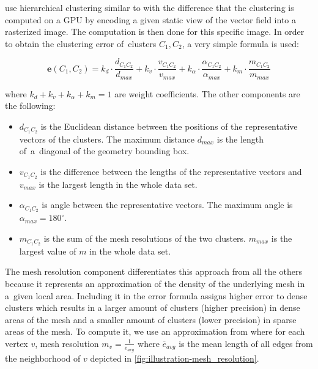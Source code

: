 \citet{Peng12} use hierarchical clustering similar to \citet{Telea99} with the difference that the clustering is computed on a GPU by encoding a given static view of the vector field into a rasterized image. The computation is then done for this specific image. In order to obtain the clustering error of~clusters \(C_1, C_2\), a very simple formula is used:

\begin{equation} \label{eq:clustering_error}
\bm{e}(C_1,C_2) = k_d \cdot \frac{d_{C_1C_2}}{d_{max}} + k_v \cdot \frac{v_{C_1C_2}}{v_{max}} + k_\alpha \cdot \frac{\alpha_{C_1C_2}}{\alpha_{max}} + k_m \cdot \frac{m_{C_1C_2}}{m_{max}}
\end{equation}

where \(k_d + k_v + k_\alpha + k_m = 1\) are weight coefficients. The other components are the following:

\begin{itemize}
\item \(d_{C_1C_2}\) is the Euclidean distance between the positions of the representative vectors of the clusters. The maximum distance \(d_{max}\) is the length of~a~diagonal of the geometry bounding box.
\item \(v_{C_1C_2}\) is the difference between the lengths of the representative vectors and \(v_{max}\) is the largest length in the whole data set.
\item \(\alpha_{C_1C_2}\) is angle between the representative vectors. The maximum angle is \(\alpha_{max} = 180^\circ\).
\item \(m_{C_1C_2}\) is the sum of the mesh resolutions of the two clusters. \(m_{max}\) is the largest value of \(m\) in the whole data set.
\end{itemize}

The mesh resolution component differentiates this approach from all the others because it represents an approximation of the density of the underlying mesh in a~given local area\footnotemark. Including it in the error formula assigns higher error to dense clusters which results in a larger amount of clusters (higher precision) in dense areas of the mesh and a smaller amount of clusters (lower precision) in sparse areas of the mesh. To compute it, we use an approximation from \citet{Peng12} where for each vertex \(v\), mesh resolution \(m_v = \frac{1}{{\overline{e}}_{avg}}\) where \(\overline{e}_{avg}\) is the mean length of all edges from the neighborhood of \(v\) depicted in \ref{fig:illustration-mesh_resolution}.

